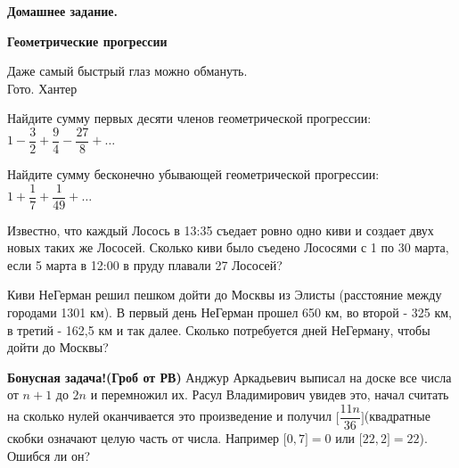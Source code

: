 \hspace{3mm}

\centerline{\bf \Huge Домашнее задание.}
\centerline{\bf \Huge Геометрические прогрессии}

\begin{flushright}
    \scriptsize{Даже самый быстрый глаз можно обмануть. \\Гото. Хантер}
\end{flushright}    


 Найдите сумму первых десяти членов геометрической прогрессии:
$1 - \dfrac{3}{2} + \dfrac{9}{4} - \dfrac{27}{8} + \dotsc$

\hspace{3mm}

 Найдите сумму бесконечно убывающей геометрической прогрессии: $1 + \dfrac{1}{7} + \dfrac{1}{49} + \dotsc$

\hspace{3mm}

 Известно, что каждый Лосось в 13:35 съедает ровно одно киви и создает двух новых таких же Лососей. Сколько киви было съедено Лососями с 1 по 30 марта, если 5 марта в 12:00 в пруду плавали 27 Лососей?

\hspace{3mm}

 Киви НеГерман решил пешком дойти до Москвы из Элисты (расстояние между городами 1301 км). В первый день НеГерман прошел 650 км, во второй - 325 км, в третий - 162,5 км и так далее. Сколько потребуется дней НеГерману, чтобы дойти до Москвы?

\hspace{3mm}

\textbf{Бонусная задача!(Гроб от РВ)} Анджур Аркадьевич выписал на доске все числа от $n+1$ до $2n$ и перемножил их. Расул Владимирович увидев это, начал считать на сколько нулей оканчивается это произведение и получил  $\biggl[ \dfrac{11n}{36} \biggr]$(квадратные скобки означают целую часть от числа. Например $\bigl[ 0,7 \bigr] = 0$ или  $\bigl[ 22,2 \bigr] = 22$). Ошибся ли он?
